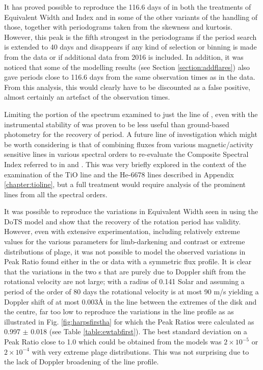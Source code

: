 It has proved possible to reproduce the 116.6 days of \citet[Table 3]{suarezmascareno15} in both the treatments of
Equivalent Width and {\ha} Index and in some of the other variants of the handling of those, together with periodograms
taken from the skewness and kurtosis. However, this peak is the fifth strongest in the periodograms if the period search
is extended to 40 days and disappears if any kind of selection or binning is made from the data or if additional data
from 2016 is included. In addition, it was noticed that some of the modelling results (see Section
\ref{section:addflares}) also gave periods close to 116.6 days from the same observation times as in the {\harps}
data. From this analysis, this would clearly have to be discounted as a false positive, almost certainly an artefact of
the observation times.

Limiting the portion of the spectrum examined to just the {\ha} line of \prox, even with the instrumental stability of
{\harps} was proven to be less useful than {\asas} ground-based photometry for the recovery of period. A future line of
investigation which might be worth considering is that of combining fluxes from various magnetic/activity sensitive
lines in various spectral orders to re-evaluate the Composite Spectral Index referred to in \citet{hall99} and
\citet{hall00}. This was very briefly explored in the context of the examination of the TiO line and the He-6678 lines
described in Appendix \ref{chapter:tioline}, but a full treatment would require analysis of the prominent lines from all
the spectral orders.

It was possible to reproduce the variations in Equivalent Width seen in {\prox} using the DoTS model and show that the
recovery of the rotation period has validity. However, even with extensive experimentation, including relatively extreme
values for the various parameters for limb-darkening and contrast or extreme distributions of plage, it was not possible
to model the observed variations in Peak Ratio found either in the {\uves} or {\harps} data with a symmetric flux
profile. It is clear that the variations in the two \horn s that are purely due to Doppler shift from the rotational
velocity are not large; with a radius of 0.141 Solar \citep{demory09} and assuming a period of the order of 80 days the
rotational velocity is at most 90 m/s yielding a Doppler shift of at most 0.003{\AA} in the {\ha} line between the
extremes of the disk and the centre, far too low to reproduce the variations in the {\ha} line profile as as illustrated
in Fig. \ref{fig:harpsfirstha} for which the Peak Ratios were calculated as 0.997 $ \pm $ 0.018 (see Table
\ref{table:ewtabfirst}). The best standard deviation on a Peak Ratio close to 1.0 which could be obtained from the
models was $2{\times}10^{-5}$ or $2{\times}10^{-4}$ with very extreme plage distributions. This was not surprising due
to the lack of Doppler broadening of the line profile.

